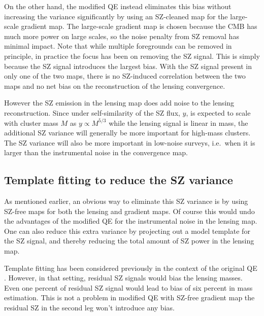 {On the other hand, the modified QE instead eliminates this bias without increasing the variance significantly by using an SZ-cleaned map for the large-scale gradient map. 
The large-scale gradient map is chosen because the CMB has much more power on large scales, so the noise penalty from SZ removal has minimal impact. 
Note that while multiple foregrounds can be removed in principle, in practice the focus has been on removing the SZ signal. 
This is simply because the SZ signal introduces the largest bias.  
With the SZ signal present in only one of the two maps, there is no SZ-induced correlation between the two maps and no net bias on the reconstruction of the lensing convergence. 

However the SZ emission in the lensing map does add noise to the lensing reconstruction. 
Since under self-similarity of the SZ flux, $y$, is expected to scale with cluster mass $M$ as $y\propto M^{5/3}$ while the lensing signal is linear in mass, the additional SZ variance will generally be more important for high-mass clusters. 
The SZ variance will also be more important in low-noise surveys, i.e.~when it is larger than the instrumental noise in the convergence map.%

\subsection{Template fitting to reduce the SZ variance}
\label{sec_sz_template_fitting}

As mentioned earlier, an obvious way to eliminate this SZ variance is by using SZ-free maps for both the lensing and gradient maps. 
Of course this would undo the advantages of the modified QE for the instrumental noise in the lensing map. 
One can also reduce this extra variance by projecting out a model template for the SZ signal, and thereby reducing the total amount of SZ power in the lensing map. 

Template fitting has been considered previously in the context of the original QE \citep{tbd?}. 
However, in that setting, residual SZ signals would bias the lensing masses. 
 Even one percent of residual SZ signal would lead to bias of six percent in mass estimation. 
This is not a problem in modified QE with SZ-free gradient map the residual SZ in the second leg won't introduce any bias. %

}
